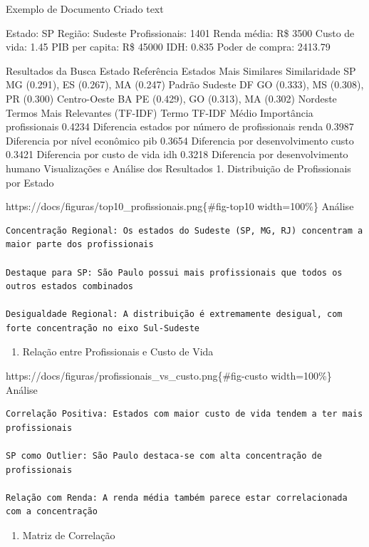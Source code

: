 \documentclass[
  11pt,
  letterpaper,
  DIV=11,
  numbers=noendperiod]{scrartcl}
\providecommand{\tightlist}{%
  \setlength{\itemsep}{0pt}\setlength{\parskip}{0pt}}
\begin{document}
Exemplo de Documento Criado text

Estado: SP Região: Sudeste Profissionais: 1401 Renda média: R\$ 3500
Custo de vida: 1.45 PIB per capita: R\$ 45000 IDH: 0.835 Poder de
compra: 2413.79

Resultados da Busca Estado Referência Estados Mais Similares
Similaridade SP MG (0.291), ES (0.267), MA (0.247) Padrão Sudeste DF GO
(0.333), MS (0.308), PR (0.300) Centro-Oeste BA PE (0.429), GO (0.313),
MA (0.302) Nordeste Termos Mais Relevantes (TF-IDF) Termo TF-IDF Médio
Importância profissionais 0.4234 Diferencia estados por número de
profissionais renda 0.3987 Diferencia por nível econômico pib 0.3654
Diferencia por desenvolvimento custo 0.3421 Diferencia por custo de vida
idh 0.3218 Diferencia por desenvolvimento humano Visualizações e Análise
dos Resultados 1. Distribuição de Profissionais por Estado

https://docs/figuras/top10\_profissionais.png\{\#fig-top10 width=100\%\}
Análise

\begin{verbatim}
Concentração Regional: Os estados do Sudeste (SP, MG, RJ) concentram a maior parte dos profissionais

Destaque para SP: São Paulo possui mais profissionais que todos os outros estados combinados

Desigualdade Regional: A distribuição é extremamente desigual, com forte concentração no eixo Sul-Sudeste
\end{verbatim}

\begin{enumerate}
\def\labelenumi{\arabic{enumi}.}
\setcounter{enumi}{1}
\tightlist
\item
  Relação entre Profissionais e Custo de Vida
\end{enumerate}

https://docs/figuras/profissionais\_vs\_custo.png\{\#fig-custo
width=100\%\} Análise

\begin{verbatim}
Correlação Positiva: Estados com maior custo de vida tendem a ter mais profissionais

SP como Outlier: São Paulo destaca-se com alta concentração de profissionais

Relação com Renda: A renda média também parece estar correlacionada com a concentração
\end{verbatim}

\begin{enumerate}
\def\labelenumi{\arabic{enumi}.}
\setcounter{enumi}{2}
\tightlist
\item
  Matriz de Correlação
\end{enumerate}
\end{document}
